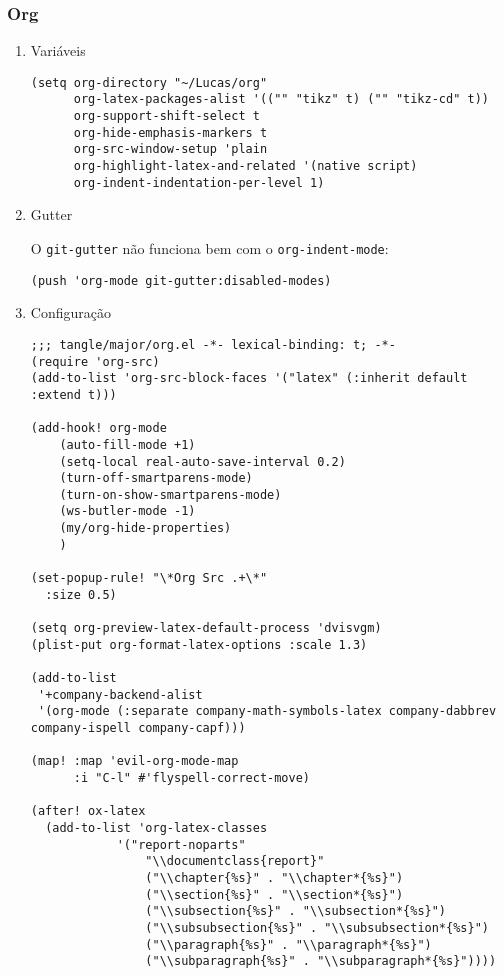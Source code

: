 \documentclass[11pt]{article}
\begin{document}
\subsubsection{Org}
\label{sec:org9dbdc7d}
\begin{enumerate}
\item Variáveis
\label{sec:org94a49b4}
\begin{verbatim}
(setq org-directory "~/Lucas/org"
      org-latex-packages-alist '(("" "tikz" t) ("" "tikz-cd" t))
      org-support-shift-select t
      org-hide-emphasis-markers t
      org-src-window-setup 'plain
      org-highlight-latex-and-related '(native script)
      org-indent-indentation-per-level 1)
\end{verbatim}

\item Gutter
\label{sec:orgdbbfd77}

O \texttt{git-gutter} não funciona bem com o \texttt{org-indent-mode}:

\begin{verbatim}
(push 'org-mode git-gutter:disabled-modes)
\end{verbatim}

\item Configuração
\label{sec:orgabf43ea}
\begin{verbatim}
;;; tangle/major/org.el -*- lexical-binding: t; -*-
(require 'org-src)
(add-to-list 'org-src-block-faces '("latex" (:inherit default :extend t)))

(add-hook! org-mode
    (auto-fill-mode +1)
    (setq-local real-auto-save-interval 0.2)
    (turn-off-smartparens-mode)
    (turn-on-show-smartparens-mode)
    (ws-butler-mode -1)
    (my/org-hide-properties)
    )

(set-popup-rule! "\*Org Src .+\*"
  :size 0.5)

(setq org-preview-latex-default-process 'dvisvgm)
(plist-put org-format-latex-options :scale 1.3)

(add-to-list
 '+company-backend-alist
 '(org-mode (:separate company-math-symbols-latex company-dabbrev company-ispell company-capf)))

(map! :map 'evil-org-mode-map
      :i "C-l" #'flyspell-correct-move)

(after! ox-latex
  (add-to-list 'org-latex-classes
            '("report-noparts"
                "\\documentclass{report}"
                ("\\chapter{%s}" . "\\chapter*{%s}")
                ("\\section{%s}" . "\\section*{%s}")
                ("\\subsection{%s}" . "\\subsection*{%s}")
                ("\\subsubsection{%s}" . "\\subsubsection*{%s}")
                ("\\paragraph{%s}" . "\\paragraph*{%s}")
                ("\\subparagraph{%s}" . "\\subparagraph*{%s}"))))


\end{verbatim}
\end{enumerate}
\end{document}
